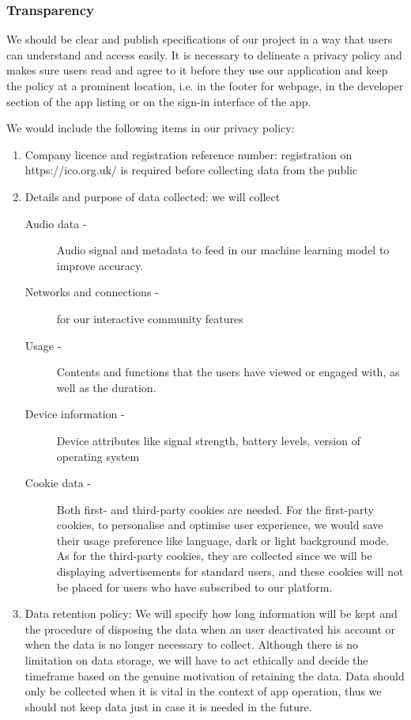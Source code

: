 \subsubsection{Transparency}
We should be clear and publish specifications of our project in a way that users can understand and access
easily. It is necessary to delineate a privacy policy and makes sure users read and agree to it before they use
our application and keep the policy at a prominent location, i.e. in the footer for webpage, in the developer
section of the app listing or on the sign-in interface of the app.

\linebreak
We would include the following items in our privacy policy:
\begin{enumerate}
    \item Company licence and registration reference number: registration on https://ico.org.uk/ is required
    before collecting data from the public
    \item Details and purpose of data collected: we will collect
    \begin{description}
        \item[Audio data - ] Audio signal and metadata to feed in our machine learning model to improve accuracy.
        \item[Networks and connections - ] for our interactive community features
        \item[Usage - ] Contents and functions that the users have viewed or engaged with, as well as the duration.
        \item[Device information - ] Device attributes like signal strength, battery levels, version of operating system
        \item[Cookie data - ] Both first- and third-party cookies are needed. For the first-party cookies, to personalise and optimise user
        experience, we would save their usage preference like language, dark or light background mode. As for the third-party cookies,
        they are collected since we will be displaying advertisements for standard users, and these cookies will not be placed for users
        who have subscribed to our platform.
    \end{description}
    \item Data retention policy: We will specify how long information will be kept and the procedure of disposing the data when an user deactivated
    his account or when the data is no longer necessary to collect. Although there is no limitation on data storage, we will have to act ethically and
    decide the timeframe based on the genuine motivation of retaining the data. Data should only be collected when it is vital in the context
    of app operation, thus we should not keep data just in case it is needed in the future.



\end{enumerate}

